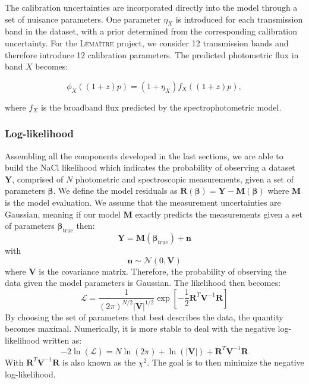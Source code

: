 The calibration uncertainties are incorporated directly into the model through a set of nuisance parameters. 
One parameter $\eta_X$ is introduced for each transmission band in the dataset, with a prior determined from 
the corresponding calibration uncertainty. For the \textsc{Lemaître} project, we consider 12 transmission bands and 
therefore introduce 12 calibration parameters. The predicted photometric flux in band $X$ becomes:

\begin{equation}
\phi_X((1+z)p) = (1+\eta_X) f_X((1+z)p),
\end{equation}

where $f_X$ is the broadband flux predicted by the spectrophotometric model.


\subsubsection{Log-likelihood} \label{sec:nacl_likelihood}

Assembling all the components developed in the last sections,
we are able to build the NaCl likelihood which indicates the probability 
of observing a dataset $\mathbf{Y}$, comprised of $N$ photometric and spectroscopic measurements, given a set of parameters $\boldsymbol{\beta}$.
We define the model residuals as $\mathbf{R}(\boldsymbol{\beta}) = \mathbf{Y} - \mathbf{M}(\boldsymbol{\beta})$ where $\mathbf{M}$ is the model evaluation. 
We assume that the measurement uncertainties are Gaussian, meaning if our model $\mathbf{M}$ exactly predicts the measurements given a set of 
parameters $\boldsymbol{\beta}_{\text{true}}$ then:
\begin{equation}
    \mathbf{Y} = \mathbf{M}(\boldsymbol{\beta}_{\text{true}}) + \mathbf{n}
\end{equation}
with 
\begin{equation}
    \mathbf{n} \sim \mathcal{N}(0, \mathbf{V})
\end{equation}
where $ \mathbf{V}$ is the covariance matrix. Therefore, the probability of observing the data given the model parameters is Gaussian. 
The likelihood then becomes:
\begin{equation}
    \mathcal{L} = \frac{1}{\left(2 \pi \right)^{N/2} |\mathbf{V}|^{1/2}} \exp \left[
        -\frac{1}{2}\mathbf{R}^{T} \mathbf{V}^{-1} \mathbf{R}
    \right]
\end{equation}
By choosing the set of parameters that best describes the data, the quantity becomes maximal. Numerically, it is more stable to deal with the negative 
log-likelihood written as:
\begin{equation}
    -2 \ln (\mathcal{L}) = N\ln(2\pi) + \ln(|\mathbf{V}|) + \mathbf{R}^T\mathbf{V}^{-1}\mathbf{R}
\end{equation}
With $\mathbf{R}^T\mathbf{V}^{-1}\mathbf{R}$ is also known as the $\chi^2$. The goal is to then minimize the negative log-likelihood. \\

